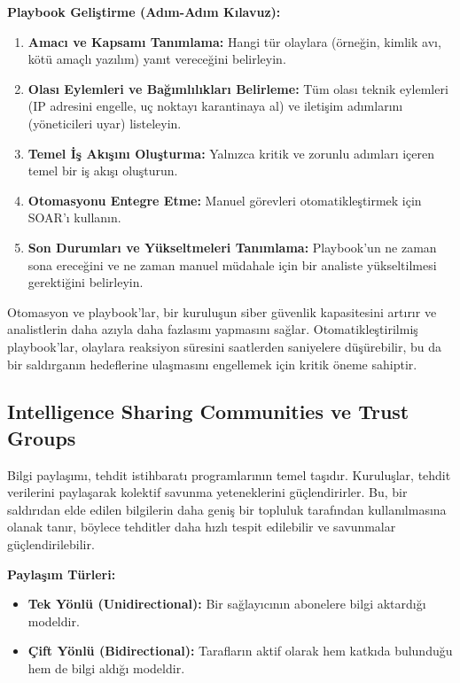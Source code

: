 \textbf{Playbook Geliştirme (Adım-Adım Kılavuz):}
\begin{enumerate}
    \item \textbf{Amacı ve Kapsamı Tanımlama:} Hangi tür olaylara (örneğin, kimlik avı, kötü amaçlı yazılım) yanıt vereceğini belirleyin.
    \item \textbf{Olası Eylemleri ve Bağımlılıkları Belirleme:} Tüm olası teknik eylemleri (IP adresini engelle, uç noktayı karantinaya al) ve iletişim adımlarını (yöneticileri uyar) listeleyin.
    \item \textbf{Temel İş Akışını Oluşturma:} Yalnızca kritik ve zorunlu adımları içeren temel bir iş akışı oluşturun.
    \item \textbf{Otomasyonu Entegre Etme:} Manuel görevleri otomatikleştirmek için SOAR'ı kullanın.
    \item \textbf{Son Durumları ve Yükseltmeleri Tanımlama:} Playbook'un ne zaman sona ereceğini ve ne zaman manuel müdahale için bir analiste yükseltilmesi gerektiğini belirleyin.
\end{enumerate}

Otomasyon ve playbook'lar, bir kuruluşun siber güvenlik kapasitesini artırır ve analistlerin daha azıyla daha fazlasını yapmasını sağlar. Otomatikleştirilmiş playbook'lar, olaylara reaksiyon süresini saatlerden saniyelere düşürebilir, bu da bir saldırganın hedeflerine ulaşmasını engellemek için kritik öneme sahiptir.

\subsection{Intelligence Sharing Communities ve Trust Groups}

Bilgi paylaşımı, tehdit istihbaratı programlarının temel taşıdır. Kuruluşlar, tehdit verilerini paylaşarak kolektif savunma yeteneklerini güçlendirirler. Bu, bir saldırıdan elde edilen bilgilerin daha geniş bir topluluk tarafından kullanılmasına olanak tanır, böylece tehditler daha hızlı tespit edilebilir ve savunmalar güçlendirilebilir.

\textbf{Paylaşım Türleri:}
\begin{itemize}
    \item \textbf{Tek Yönlü (Unidirectional):} Bir sağlayıcının abonelere bilgi aktardığı modeldir.
    \item \textbf{Çift Yönlü (Bidirectional):} Tarafların aktif olarak hem katkıda bulunduğu hem de bilgi aldığı modeldir.
\end{itemize}


